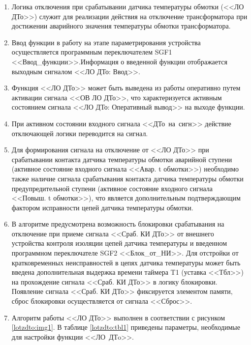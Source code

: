 \documentclass[a4paper, 12pt,table, hidelinks, DIV=calc]{extarticle} %
\begin{document}
\begin{enumerate}[label=\arabic{section}.\arabic{subsection}.\arabic{enumi}, labelsep=4pt, leftmargin=0pt, itemindent=57pt, itemsep=0pt, parsep=5pt]
\begin{enumerate}[label=\arabic{section}.\arabic{subsection}.\arabic{enumi}.\arabic*, labelsep=4pt, leftmargin=0em, itemindent=65pt, parsep=0pt]
\item
Логика отключения при срабатывании датчика температуры обмотки (<<ЛО ДТо>>) служит для реализации действия на отключение трансформатора при достижении аварийного значения температуры обмотки трансформатора.

\item
Ввод функции в работу на этапе параметрирования устройства осуществляется программным переключателем SGF1 <<Ввод\_функции>>.Информация о введенной функции отображается выходным сигналом <<ЛО ДТо: Ввод>>. 
\item
Функция <<ЛО ДТо>> может быть выведена из работы оперативно путем активации сигнала <<ОВ ЛО ДТо>>, что характеризуется активным состоянием сигнала <<ЛО ДТо: Оперативный вывод>> на выходе функции. 
\item
При активном состоянии входного сигнала <<ДТо~на~сигн>> действие отключающей логики переводится на сигнал.
\item
Для формирования сигнала на отключение от <<ЛО ДТо>> при срабатывании контакта датчика температуры обмотки аварийной ступени (активное состояние входного сигнала <<Авар. t обмотки>>) необходимо также наличие сигнала срабатывания контакта датчика температуры обмотки предупредительной ступени (активное состояние входного сигнала <<Повыш. t обмотки>>), что является дополнительным подтверждающим фактором исправности цепей датчика температуры обмотки.

\item
В алгоритме предусмотрена возможность блокировки срабатывания на отключение при приеме сигнала <<Сраб. КИ ДТо>> от внешнего устройства контроля изоляции цепей датчика температуры и введенном программном переключателе SGF2 <<Блок\_от\_НИ>>. Для отстройки от кратковременных неисправностей в цепях датчика температуры может быть введена дополнительная выдержка времени таймера T1 (уставка <<Тбл>>) на прохождение сигнала <<Сраб. КИ ДТо>> в логику блокировки. 
Появление сигнала <<Сраб. КИ ДТо>> фиксируется элементом памяти, сброс блокировки осуществляется от сигнала <<Сброс>>.

\item
Алгоритм работы <<ЛО ДТо>> выполнен в соответствии с рисунком \ref{lotzdto:img1}. В таблице \ref{lotzdto:tbl1} приведены параметры, необходимые для настройки функции <<ЛО~ДТo>>.


\end{enumerate}
\end{enumerate}
\end{document}
